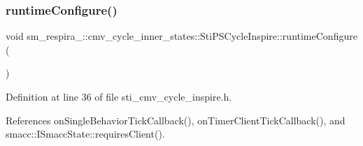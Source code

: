 \subsubsection{\texorpdfstring{runtime\+Configure()}{runtimeConfigure()}}
{\footnotesize\ttfamily void sm\+\_\+respira\+\_\+::cmv\+\_\+cycle\+\_\+inner\+\_\+states\+::\+Sti\+P\+S\+Cycle\+Inspire\+::runtime\+Configure (\begin{DoxyParamCaption}{ }\end{DoxyParamCaption})\hspace{0.3cm}{\ttfamily [inline]}}



Definition at line 36 of file sti\+\_\+cmv\+\_\+cycle\+\_\+inspire.\+h.



References on\+Single\+Behavior\+Tick\+Callback(), on\+Timer\+Client\+Tick\+Callback(), and smacc\+::\+I\+Smacc\+State\+::requires\+Client().



